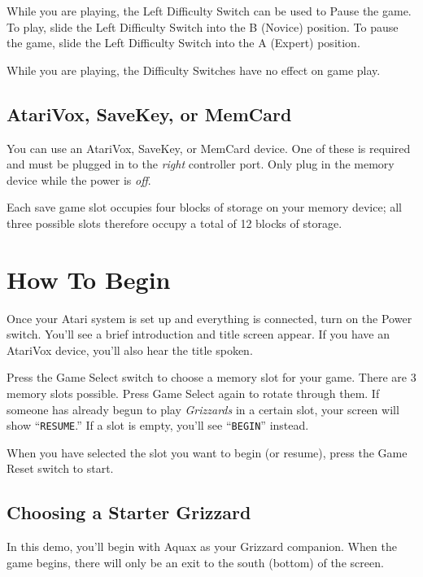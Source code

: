 \documentclass[12pt,twoside,openright,book]{memoir}
\begin{document}
\ifdefined\TVSECAM

While you are  playing, the Left Difficulty Switch can  be used to Pause
the  game.  To   play,  slide  the  Left  Difficulty   Switch  into  the
B (Novice) position. To pause the game, slide the Left Difficulty Switch
into the A (Expert) position.

\else

While  you  are playing,  the  Difficulty  Switches  have no  effect  on
game play.

\fi

\section{AtariVox, SaveKey, or MemCard}

You can  use an AtariVox,  SaveKey, or MemCard  device. One of  these is
required and  must be  plugged in to  the \emph{right}  controller port.
Only plug in the memory device while the power is \emph{off}.

Each  save game  slot occupies  four blocks  of storage  on your  memory
device; all three  possible slots therefore occupy a total  of 12 blocks
of storage.

\chapter{How To Begin}\label{How To Begin}

Once your  Atari system is set  up and everything is  connected, turn on
the  Power switch.  You'll see  a  brief introduction  and title  screen
appear.  If  you   have  an  AtariVox  device,  you'll   also  hear  the
title spoken.

Press the  Game Select  switch to  choose a memory  slot for  your game.
There are  3 memory slots  possible. Press  Game Select again  to rotate
through them. If someone has already begun to play \textit{Grizzards} in
a certain slot, your screen will  show ``\texttt{RESUME}.'' If a slot is
empty, you'll see ``\texttt{BEGIN}'' instead.

When you have selected the slot you want to begin (or resume), press the
Game Reset switch to start.

\section{Choosing a Starter Grizzard}

\ifdef\DEMO

In  this demo,  you'll  begin  with Aquax  as  your Grizzard  companion.
When the game begins,  there will only be an exit  to the south (bottom)
of the screen.
\end{document}
